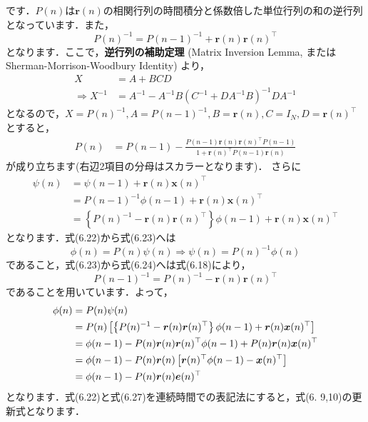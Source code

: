 です．$P(n)$は$\boldsymbol{r}(n)$の相関行列の時間積分と係数倍した単位行列の和の逆行列となっています．また，
\begin{equation}
P(n)^{-1}=P(n-1)^{-1}+\boldsymbol{r}(n) \boldsymbol{r}(n)^\top
\end{equation}
となります．ここで，\textbf{逆行列の補助定理} (Matrix Inversion Lemma, またはSherman-Morrison-Woodbury Identity) より，
\begin{align}
X&=A+BCD\\
\Rightarrow X^{-1}&=A^{-1} - A^{-1}B(C^{-1}+DA^{-1}B)^{-1}DA^{-1}
\end{align}
となるので，$X={P}(n)^{-1}, A=P(n-1)^{-1}, B= \boldsymbol{r}(n), C=I_{N}, D=\boldsymbol{r}(n)^\top$とすると，
\begin{align}
P(n)&=P(n-1)-\frac{P(n-1) \boldsymbol{r}(n) \boldsymbol{r}(n)^\top P(n-1)}{1+\boldsymbol{r}(n)^\top P(n-1) \boldsymbol{r}(n)} 
\end{align}
が成り立ちます(右辺2項目の分母はスカラーとなります)．
さらに
\begin{align}
\psi(n)&=\psi(n-1)+\boldsymbol{r}(n)\boldsymbol{x}(n)^\top\\
&=P(n-1)^{-1}\phi(n-1)+\boldsymbol{r}(n)\boldsymbol{x}(n)^\top\\
&=\left\{P(n)^{-1}-\boldsymbol{r}(n) \boldsymbol{r}(n)^\top\right\}\phi(n-1)+\boldsymbol{r}(n)\boldsymbol{x}(n)^\top
\end{align}
となります．式(6.22)から式(6.23)へは
\begin{equation}
\phi(n)=P(n)\psi(n) \Rightarrow \psi(n)=P(n)^{-1}\phi(n)
\end{equation}
であること，式(6.23)から式(6.24)へは式(6.18)により，
\begin{equation}
P(n-1)^{-1}=P(n)^{-1}-\boldsymbol{r}(n) \boldsymbol{r}(n)^\top
\end{equation}
であることを用いています．よって，
\begin{align}
\phi(n)&=P(n)\psi(n)\notag\\
&=P(n)\left[\left\{P(n)^{-1}-\boldsymbol{r}(n) \boldsymbol{r}(n)^\top\right\}\phi(n-1)+\boldsymbol{r}(n)\boldsymbol{x}(n)^\top\right]\notag\\
&=\phi(n-1)-P(n)\boldsymbol{r}(n)\boldsymbol{r}(n)^\top\phi(n-1)+P(n)\boldsymbol{r}(n)\boldsymbol{x}(n)^\top\notag\\
&=\phi(n-1)-P(n)\boldsymbol{r}(n)\left[\boldsymbol{r}(n)^\top\phi(n-1)-\boldsymbol{x}(n)^\top\right]\notag\\
&=\phi(n-1)-P(n)\boldsymbol{r}(n)\boldsymbol{e}(n)^\top
\end{align}
となります．式(6.22)と式(6.27)を連続時間での表記法にすると，式(6. 9,10)の更新式となります．
